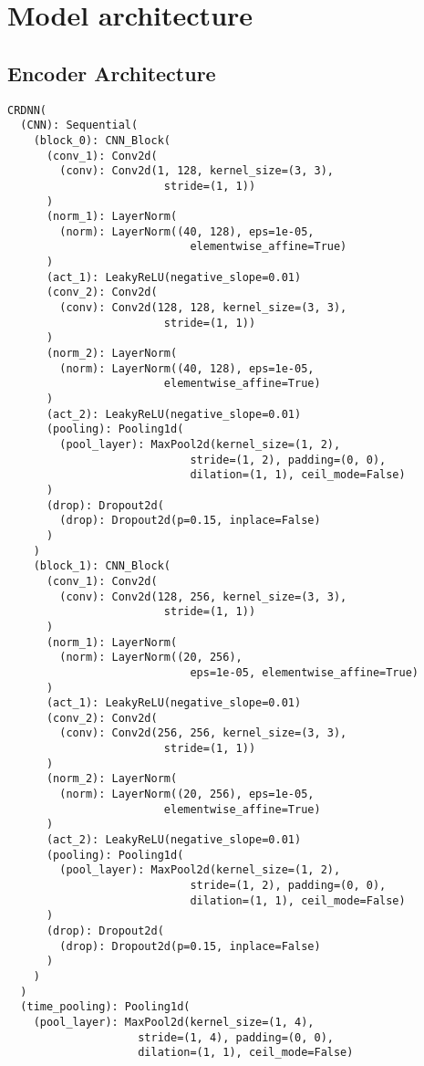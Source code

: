 \chapter{Model architecture}
\label{chapter:model-architecture}

\section{Encoder Architecture}

\begin{verbatim}
CRDNN(
  (CNN): Sequential(
    (block_0): CNN_Block(
      (conv_1): Conv2d(
        (conv): Conv2d(1, 128, kernel_size=(3, 3), 
                        stride=(1, 1))
      )
      (norm_1): LayerNorm(
        (norm): LayerNorm((40, 128), eps=1e-05, 
                            elementwise_affine=True)
      )
      (act_1): LeakyReLU(negative_slope=0.01)
      (conv_2): Conv2d(
        (conv): Conv2d(128, 128, kernel_size=(3, 3), 
                        stride=(1, 1))
      )
      (norm_2): LayerNorm(
        (norm): LayerNorm((40, 128), eps=1e-05, 
                        elementwise_affine=True)
      )
      (act_2): LeakyReLU(negative_slope=0.01)
      (pooling): Pooling1d(
        (pool_layer): MaxPool2d(kernel_size=(1, 2), 
                            stride=(1, 2), padding=(0, 0), 
                            dilation=(1, 1), ceil_mode=False)
      )
      (drop): Dropout2d(
        (drop): Dropout2d(p=0.15, inplace=False)
      )
    )
    (block_1): CNN_Block(
      (conv_1): Conv2d(
        (conv): Conv2d(128, 256, kernel_size=(3, 3), 
                        stride=(1, 1))
      )
      (norm_1): LayerNorm(
        (norm): LayerNorm((20, 256), 
                            eps=1e-05, elementwise_affine=True)
      )
      (act_1): LeakyReLU(negative_slope=0.01)
      (conv_2): Conv2d(
        (conv): Conv2d(256, 256, kernel_size=(3, 3), 
                        stride=(1, 1))
      )
      (norm_2): LayerNorm(
        (norm): LayerNorm((20, 256), eps=1e-05, 
                        elementwise_affine=True)
      )
      (act_2): LeakyReLU(negative_slope=0.01)
      (pooling): Pooling1d(
        (pool_layer): MaxPool2d(kernel_size=(1, 2), 
                            stride=(1, 2), padding=(0, 0), 
                            dilation=(1, 1), ceil_mode=False)
      )
      (drop): Dropout2d(
        (drop): Dropout2d(p=0.15, inplace=False)
      )
    )
  )
  (time_pooling): Pooling1d(
    (pool_layer): MaxPool2d(kernel_size=(1, 4), 
                    stride=(1, 4), padding=(0, 0), 
                    dilation=(1, 1), ceil_mode=False)

\end{verbatim}
